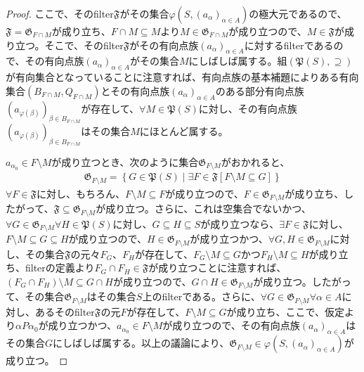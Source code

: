 \documentclass[dvipdfmx]{jsarticle}
\begin{document}
\begin{proof}
ここで、そのfilter$\mathfrak{F}$がその集合$\varphi\left( S,\left( a_{\alpha} \right)_{\alpha \in A} \right)$の極大元であるので、$\mathfrak{F} =\mathfrak{G}_{F \cap M}$が成り立ち、$F \cap M \subseteq M$より$M \in \mathfrak{G}_{F \cap M}$が成り立つので、$M \in \mathfrak{F}$が成り立つ。そこで、そのfilter$\mathfrak{F}$がその有向点族$\left( a_{\alpha} \right)_{\alpha \in A}$に対するfilterであるので、その有向点族$\left( a_{\alpha} \right)_{\alpha \in A}$がその集合$M$にしばしば属する。組$\left( \mathfrak{P}(S), \supseteq \right)$が有向集合となっていることに注意すれば、有向点族の基本補題によりある有向集合$\left( B_{F \cap M},Q_{F \cap M} \right)$とその有向点族$\left( a_{\alpha} \right)_{\alpha \in A}$のある部分有向点族$\left( a_{\varphi(\beta)} \right)_{\beta \in B_{F \cap M}}$が存在して、$\forall M \in \mathfrak{P}(S)$に対し、その有向点族$\left( a_{\varphi(\beta)} \right)_{\beta \in B_{F \cap M}}$はその集合$M$にほとんど属する。\par
$a_{\alpha_{0}} \in F \setminus M$が成り立つとき、次のように集合$\mathfrak{G}_{F \setminus M}$がおかれると、
\begin{align*}
\mathfrak{G}_{F \setminus M} = \left\{ G \in \mathfrak{P}(S) \middle| \exists F \in \mathfrak{F}[ F \setminus M \subseteq G] \right\}
\end{align*}
$\forall F \in \mathfrak{F}$に対し、もちろん、$F \setminus M \subseteq F$が成り立つので、$F \in \mathfrak{G}_{F \setminus M}$が成り立ち、したがって、$\mathfrak{F \subseteq}\mathfrak{G}_{F \setminus M}$が成り立つ。さらに、これは空集合でないかつ、$\forall G \in \mathfrak{G}_{F \setminus M}\forall H \in \mathfrak{P}(S)$に対し、$G \subseteq H \subseteq S$が成り立つなら、$\exists F \in \mathfrak{F}$に対し、$F \setminus M \subseteq G \subseteq H$が成り立つので、$H \in \mathfrak{G}_{F \setminus M}$が成り立つかつ、$\forall G,H \in \mathfrak{G}_{F \setminus M}$に対し、その集合$\mathfrak{F}$の元々$F_{G}$、$F_{H}$が存在して、$F_{G} \setminus M \subseteq G$かつ$F_{H} \setminus M \subseteq H$が成り立ち、filterの定義より$F_{G} \cap F_{H}\in \mathfrak{F}$が成り立つことに注意すれば、$\left( F_{G} \cap F_{H} \right) \setminus M \subseteq G \cap H$が成り立つので、$G \cap H \in \mathfrak{G}_{F \setminus M}$が成り立つ。したがって、その集合$\mathfrak{G}_{F \setminus M}$はその集合$S$上のfilterである。さらに、$\forall G \in \mathfrak{G}_{F \setminus M}\forall\alpha \in A$に対し、あるそのfilter$\mathfrak{F}$の元$F$が存在して、$F \setminus M \subseteq G$が成り立ち、ここで、仮定より$\alpha P\alpha_{0}$が成り立つかつ、$a_{\alpha_{0}} \in F \setminus M$が成り立つので、その有向点族$\left( a_{\alpha} \right)_{\alpha \in A}$はその集合$G$にしばしば属する。以上の議論により、$\mathfrak{G}_{F \setminus M} \in \varphi\left( S,\left( a_{\alpha} \right)_{\alpha \in A} \right)$が成り立つ。\par

\end{proof}
\end{document}

